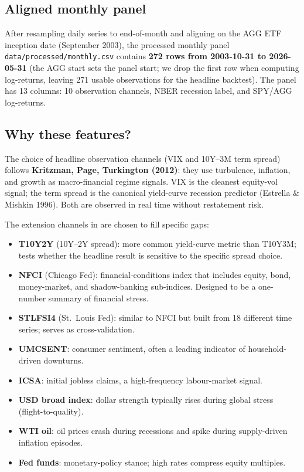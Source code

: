 \documentclass[11pt]{article}
\theoremstyle{plain1}
\theoremstyle{definition1}
\newcommand{\1}{\mathbf{1}}
\begin{document}
\subsection{Aligned monthly panel}

After resampling daily series to end-of-month and aligning on the AGG ETF inception date (September 2003), the processed monthly panel \texttt{data/processed/monthly.csv} contains \textbf{272 rows from 2003-10-31 to 2026-05-31} (the AGG start sets the panel start; we drop the first row when computing log-returns, leaving 271 usable observations for the headline backtest). The panel has 13 columns: 10 observation channels, NBER recession label, and SPY/AGG log-returns.

\subsection{Why these features?}

The choice of headline observation channels (VIX and 10Y--3M term spread) follows \textbf{Kritzman, Page, Turkington (2012)}: they use turbulence, inflation, and growth as macro-financial regime signals. VIX is the cleanest equity-vol signal; the term spread is the canonical yield-curve recession predictor (Estrella \& Mishkin 1996). Both are observed in real time without restatement risk.

The extension channels in  are chosen to fill specific gaps:
\begin{itemize}[leftmargin=1.5em,itemsep=2pt]
  \item \textbf{T10Y2Y} (10Y--2Y spread): more common yield-curve metric than T10Y3M; tests whether the headline result is sensitive to the specific spread choice.
  \item \textbf{NFCI} (Chicago Fed): financial-conditions index that includes equity, bond, money-market, and shadow-banking sub-indices. Designed to be a one-number summary of financial stress.
  \item \textbf{STLFSI4} (St.\ Louis Fed): similar to NFCI but built from 18 different time series; serves as cross-validation.
  \item \textbf{UMCSENT}: consumer sentiment, often a leading indicator of household-driven downturns.
  \item \textbf{ICSA}: initial jobless claims, a high-frequency labour-market signal.
  \item \textbf{USD broad index}: dollar strength typically rises during global stress (flight-to-quality).
  \item \textbf{WTI oil}: oil prices crash during recessions and spike during supply-driven inflation episodes.
  \item \textbf{Fed funds}: monetary-policy stance; high rates compress equity multiples.
\end{itemize}
\end{document}

